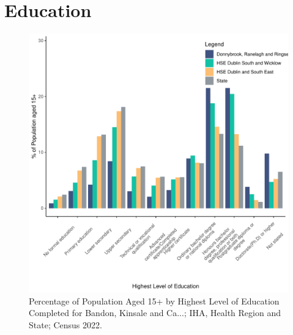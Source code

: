 \documentclass{article}
\begin{document}
\section{Education}\label{sect:Edu}
\begin{figure}[H]
	\centering
	\includegraphics[width = 120mm]{../figures/EduED.pdf}
	\caption{Percentage of Population Aged 15+ by Highest Level of Education Completed for Bandon, Kinsale and Ca...; IHA, Health Region and State; Census 2022.}
	\label{fig:vbnv}
	\end{figure}
\end{document}
